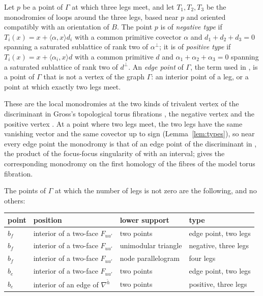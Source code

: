 \begin{definition}\label{def:types}
Let $p$ be a point of $\Gamma$ at which three legs meet, and let $T_1,T_2,T_3$ be the monodromies of loops around the three legs,
based near $p$ and oriented compatibly with an orientation of $B$. The point $p$ is of \emph{negative type} if
$T_i(x)=x+\langle\alpha,x\rangle d_i$ with a common primitive covector $\alpha$ and $d_1+d_2+d_3=0$ spanning a saturated
sublattice of rank two of $\alpha^\perp$; it is of \emph{positive type} if $T_i(x)=x+\langle\alpha_i,x\rangle d$ with a common
primitive $d$ and $\alpha_1+\alpha_2+\alpha_3=0$ spanning a saturated sublattice of rank two of $d^\perp$. An
\emph{edge point} of $\Gamma$, the term used in \cite[Def.~7.2(b)]{CBM}, is a point of $\Gamma$ that is not a vertex of the graph $\Gamma$: an interior point of a leg, or a
point at which exactly two legs meet.
\end{definition}

These are the local monodromies at the two kinds of trivalent vertex of the discriminant in Gross's topological torus
fibrations \cite[Thm.~1.11(2)]{Gross01}, the negative vertex \cite[Ex.~2.3]{CBM} and the positive vertex \cite[Ex.~2.4]{CBM}. At a point
where two legs meet, the two legs have the same vanishing vector and the same covector up to sign (Lemma~\ref{lem:types}), so
near every edge point the monodromy is that of an edge point of the discriminant in \cite[Ex.~2.2]{CBM}, the product of
the focus-focus singularity of \cite[Ex.~2.1]{CBM} with an interval; \cite[\S3.2, (4)]{CBM} gives the corresponding
monodromy on the first homology of the fibres of the model torus fibration.

\begin{lemma}\label{lem:types}
The points of $\Gamma$ at which the number of legs is not zero are the following, and no others:
\begin{center}
\begin{tabular}{llll}
point & position & lower support & type\\\hline
$b_f$ & interior of a two-face $F_{uu'}$ & two points & edge point, two legs\\
$b_f$ & interior of a two-face $F_{uu'}$ & unimodular triangle & negative, three legs\\
$b_f$ & interior of a two-face $F_{uu'}$ & node parallelogram & four legs\\
$b_e$ & interior of a two-face $F_{uu'}$ & two points & edge point, two legs\\
$b_e$ & interior of an edge of $\nabla^{\check h}$ & two points & positive, three legs
\end{tabular}
\end{center}
\end{lemma}

